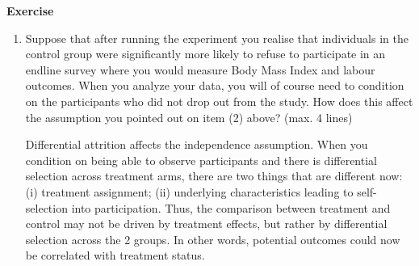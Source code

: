 \documentclass[10pt]{article}
\newcounter{exercise}
\newenvironment{exercise}%
{%
	\refstepcounter{exercise}%
	\textbf{Exercise \theexercise}%
	}%
{
 \par\vspace{\baselineskip}%
\noindent\ignorespacesafterend
}
\begin{document}
\begin{exercise}
\begin{enumerate}
		\color{red}
			Randomisation buys you independence. The other 3 assumptions you have to argue they hold.		
		\color{black}
		\item Suppose that after running the experiment you realise that individuals in the control group were significantly more likely to refuse to participate in an endline survey where you would measure Body Mass Index and labour outcomes. When you analyze your data, you will of course need to condition on the participants who did not drop out from the study. How does this affect the assumption you pointed out on item (2) above? (max. 4 lines)
		
		\color{red}
			Differential attrition affects the independence assumption. When you condition on being able to observe participants and there is differential selection across treatment arms, there are two things that are different now: (i) treatment assignment; (ii) underlying characteristics leading to self-selection into participation. Thus, the comparison between treatment and control may not be driven by treatment effects, but rather by differential selection across the 2 groups. In other words, potential outcomes could now be correlated with treatment status.
		\color{black}
	\end{enumerate}
\end{exercise}

\end{document}
